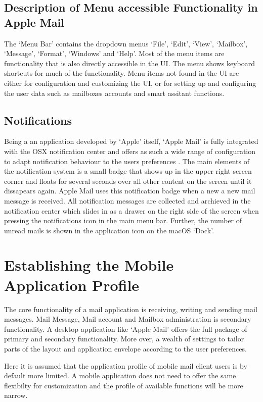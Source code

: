 \documentclass[a4paper,11pt,twoside]{article}
\begin{document}
\subsection{Description of Menu accessible Functionality in Apple Mail}
The `Menu Bar' contains the dropdown menus `File', `Edit', `View', `Mailbox',
`Message', `Format', `Windows' and `Help'. Most of the menu items are functionality
that is also directly accessible in the UI. The menu shows keyboard shortcuts for
much of the functionality. Menu items not found in the UI are either for
configuration and customizing the UI, or for setting up and configuring the user
data such as mailboxes accounts and smart assitant functions.

\subsection{Notifications}
Being a an application developed by `Apple' itself, `Apple Mail' is fully integrated
with the OSX notification center and offers as such a wide range of configuration to
adapt notification behaviour to the users preferences \cite{apple_notifications}. The
main elements of the notification system is a small badge that shows up in the upper
right screen corner and floats for several seconds over all other content on the
screen until it dissapears again. Apple Mail uses this notification badge when a
new a new mail message is received. All notification messages are collected and
archieved in the notification center which slides in as a drawer on the right side
of the screen when pressing the notifications icon in the main menu bar. Further,
the number of unread mails is shown in the application icon on the macOS `Dock'.

\section{Establishing the Mobile Application Profile}
The core functionality of a mail application is receiving, writing and sending
mail messages. Mail Message, Mail account and Mailbox administration is
secondary functionality. A desktop application like `Apple Mail' offers the
full package of primary and secondary functionality. More over, a wealth of
settings to tailor parts of the layout and application envelope according to the
user preferences.

Here it is assumed that the application profile of mobile
mail client users is by default more limited. A mobile application does not need
to offer the same flexibilty for customization and the profile of available
functions will be more narrow.
\end{document}
